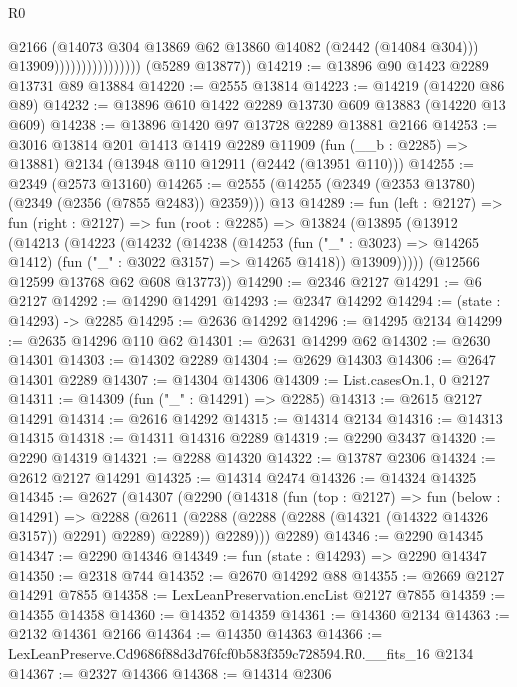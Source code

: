 \begin{lexlean}{R0}
\begin{coremodule}
                                      @2166
                                      (@14073 @304 @13869 @62 @13860 @14082 (@2442 (@14084 @304)))
                                      @13909))))))))))))))))
      (@5289 @13877))
@14219 := @13896 @90 @1423 @2289 @13731 @89 @13884
@14220 := @2555 @13814
@14223 := @14219 (@14220 @86 @89)
@14232 := @13896 @610 @1422 @2289 @13730 @609 @13883 (@14220 @13 @609)
@14238 := @13896 @1420 @97 @13728 @2289 @13881 @2166
@14253 := @3016
    @13814
    @201
    @1413
    @1419
    @2289
    @11909
    (fun (__b : @2285) => @13881)
    @2134
    (@13948 @110 @12911 (@2442 (@13951 @110)))
@14255 := @2349 (@2573 @13160)
@14265 := @2555 (@14255 (@2349 (@2353 @13780) (@2349 (@2356 (@7855 @2483)) @2359))) @13
@14289 := fun (left : @2127) =>
  fun (right : @2127) =>
  fun (root : @2285) =>
  @13824
    (@13895
      (@13912
        (@14213
          (@14223
            (@14232
              (@14238
                (@14253
                  (fun ("_" : @3023) => @14265 @1412)
                  (fun ("_" : @3022 @3157) => @14265 @1418))
                @13909)))))
      (@12566 @12599 @13768 @62 @608 @13773))
@14290 := @2346 @2127
@14291 := @6 @2127
@14292 := @14290 @14291
@14293 := @2347 @14292
@14294 := (state : @14293) -> @2285
@14295 := @2636 @14292
@14296 := @14295 @2134
@14299 := @2635 @14296 @110 @62
@14301 := @2631 @14299 @62
@14302 := @2630 @14301
@14303 := @14302 @2289
@14304 := @2629 @14303
@14306 := @2647 @14301 @2289
@14307 := @14304 @14306
@14309 := List.casesOn.{1, 0} @2127
@14311 := @14309 (fun ("_" : @14291) => @2285)
@14313 := @2615 @2127 @14291
@14314 := @2616 @14292
@14315 := @14314 @2134
@14316 := @14313 @14315
@14318 := @14311 @14316 @2289
@14319 := @2290 @3437
@14320 := @2290 @14319
@14321 := @2288 @14320
@14322 := @13787 @2306
@14324 := @2612 @2127 @14291
@14325 := @14314 @2474
@14326 := @14324 @14325
@14345 := @2627
    (@14307
      (@2290
        (@14318
          (fun (top : @2127) =>
          fun (below : @14291) =>
          @2288
            (@2611 (@2288 (@2288 (@2288 (@14321 (@14322 @14326 @3157)) @2291) @2289) @2289))
            @2289)))
      @2289)
@14346 := @2290 @14345
@14347 := @2290 @14346
@14349 := fun (state : @14293) => @2290 @14347
@14350 := @2318 @744
@14352 := @2670 @14292 @88
@14355 := @2669 @2127 @14291 @7855
@14358 := LexLeanPreservation.encList @2127 @7855
@14359 := @14355 @14358
@14360 := @14352 @14359
@14361 := @14360 @2134
@14363 := @2132 @14361 @2166
@14364 := @14350 @14363
@14366 := LexLeanPreserve.Cd9686f88d3d76fcf0b583f359c728594.R0.__fits_16 @2134
@14367 := @2327 @14366
@14368 := @14314 @2306

\end{coremodule}
\end{lexlean}

